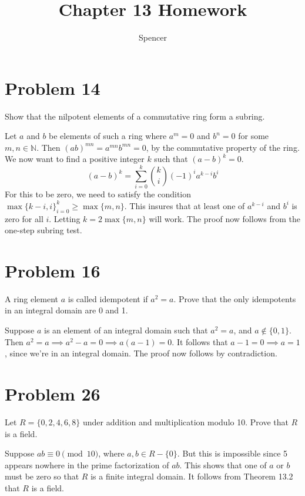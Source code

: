 \documentclass{article}
\title{Chapter 13 Homework}
\author{Spencer}
\begin{document}
\maketitle

\newcommand{\Z}{\mathbb{Z}}
\newcommand{\R}{\mathbb{R}}
\newcommand{\N}{\mathbb{N}}
\newcommand{\lcm}{\mbox{lcm}}

\section*{Problem 14}

Show that the nilpotent elements of a commutative ring form a subring.

Let $a$ and $b$ be elements of such a ring where $a^m=0$ and $b^n=0$ for some
$m,n\in\N$.
Then $(ab)^{mn} = a^{mn}b^{mn} = 0$, by the commutative property of the ring.
We now want to find a positive integer $k$ such that $(a-b)^k=0$.
\begin{equation*}
(a-b)^k = \sum_{i=0}^k\binom{k}{i}(-1)^ia^{k-i}b^i
\end{equation*}
For this to be zero, we need to satisfy the condition
$\max\{k-i,i\}_{i=0}^k\geq\max\{m,n\}$.
This insures that at least one of $a^{k-i}$ and $b^i$ is zero for all $i$.
Letting $k=2\max\{m,n\}$ will work.
The proof now follows from the one-step subring test.

\section*{Problem 16}

A ring element $a$ is called idempotent if $a^2=a$.
Prove that the only idempotents in an integral domain are 0 and 1.

Suppose $a$ is an element of an integral domain such that $a^2=a$, and
$a\not\in\{0,1\}$.  Then $a^2=a\implies a^2-a=0\implies a(a-1)=0$.
It follows that $a-1=0\implies a=1$, since we're in an integral domain.
The proof now follows by contradiction.

\section*{Problem 26}

Let $R=\{0,2,4,6,8\}$ under addition and multiplication modulo 10.
Prove that $R$ is a field.

Suppose $ab\equiv 0\pmod{10}$, where $a,b\in R-\{0\}$.
But this is impossible since 5 appears nowhere in the prime factorization of $ab$.
This shows that one of $a$ or $b$ must be zero so that $R$ is
a finite integral domain.  It follows from Theorem 13.2 that
$R$ is a field.
\end{document}
